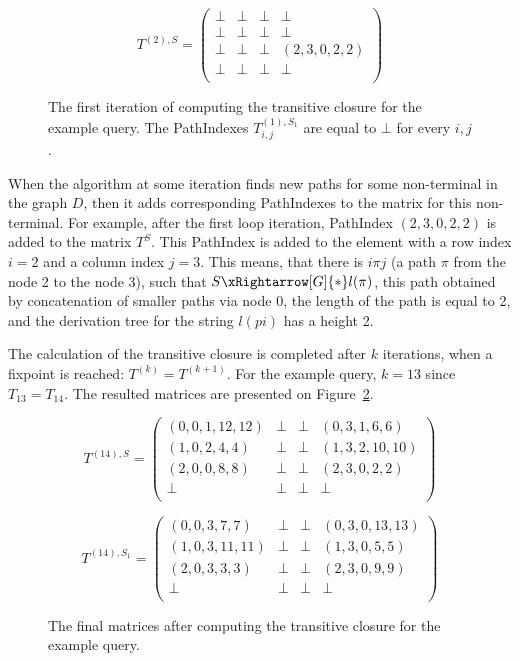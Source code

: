 \begin{figure}[h]
	\[
	T^{(2),S} = \begin{pmatrix}
	\bot & \bot       & \bot & \bot       \\
	\bot & \bot & \bot       & \bot \\
	\bot       & \bot & \bot & (2,3,0,2,2) \\
	\bot       & \bot & \bot & \bot \\
	\end{pmatrix}
	\]
	\caption{The first iteration of computing the transitive closure for the example query. The PathIndexes $T^{(1),S_1}_{i,j}$ are equal to $\bot$ for every $i,j$.}
	\label{ExampleQueryFirstIteration}
\end{figure}

When the algorithm at some iteration finds new paths for some non-terminal in the graph $D$, then it adds corresponding PathIndexes to the matrix for this non-terminal. For example, after the first loop iteration, PathIndex $(2,3,0,2,2)$ is added to the matrix $T^{S}$. This PathIndex is added to the element with a row index $i = 2$ and a column index $j = 3$. This means, that there is $i\pi j$ (a path $\pi$ from the node 2 to the node 3), such that $S \xRightarrow[G]{*} l(\pi)$, this path obtained by concatenation of smaller paths via node 0, the length of the path is equal to 2, and the derivation tree for the string $l(pi)$ has a height 2.

The calculation of the transitive closure is completed after $k$ iterations, when a fixpoint is reached: $T^{(k)} = T^{(k+1)}$. For the example query, $k = 13$ since $T_{13} = T_{14}$. The resulted matrices are presented on Figure~\ref{ExampleQueryFinalMatrices}.

\begin{figure}[h]
	\[
	T^{(14),S} = \begin{pmatrix}
	(0,0,1,12,12) & \bot       & \bot & (0,3,1,6,6)       \\
	(1,0,2,4,4) & \bot & \bot       & (1,3,2,10,10) \\
	(2,0,0,8,8)       & \bot & \bot & (2,3,0,2,2) \\
	\bot       & \bot & \bot & \bot \\
	\end{pmatrix}
	\]
	
	\[
	T^{(14),S_1} = \begin{pmatrix}
	(0,0,3,7,7)  & \bot       & \bot & (0,3,0,13,13)       \\
	(1,0,3,11,11) & \bot & \bot       & (1,3,0,5,5) \\
	(2,0,3,3,3)       & \bot & \bot & (2,3,0,9,9) \\
	\bot       & \bot & \bot & \bot \\
	\end{pmatrix}
	\]
	\caption{The final matrices after computing the transitive closure for the example query.}
	\label{ExampleQueryFinalMatrices}
\end{figure}

